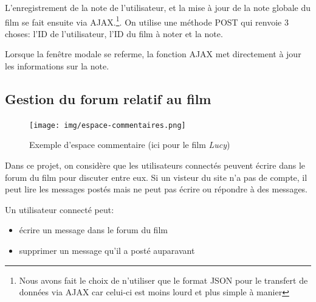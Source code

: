                 \bigskip
                L'enregistrement de la note de l'utilisateur, et la mise à jour de la note globale du film se fait ensuite via AJAX.\footnote{Nous avons fait le choix de n'utiliser que le format JSON pour le transfert de données via AJAX car celui-ci est moins lourd et plus simple à manier}. On utilise une méthode POST qui renvoie 3 choses: l'ID de l'utilisateur, l'ID du film à noter et la note.

                \medskip
                Lorsque la fenêtre modale se referme, la fonction AJAX met directement à jour les informations sur la note.

            
            \subsection{Gestion du forum relatif au film}

                \begin{figure}[!ht]
                    \centering
                    \texttt{[image: img/espace-commentaires.png]}
                    \caption{Exemple d'espace commentaire (ici pour le film {\itshape Lucy})}
                \end{figure}

                Dans ce projet, on considère que les utilisateurs connectés peuvent écrire dans le forum du film pour discuter entre eux. Si un visteur du site n'a pas de compte, il peut lire les messages postés mais ne peut pas écrire ou répondre à des messages.

                \medskip
                Un utilisateur connecté peut:
                \begin{itemize}
                    \item écrire un message dans le forum du film
                    \item supprimer un message qu'il a posté auparavant
                \end{itemize}


                

                \bigskip

